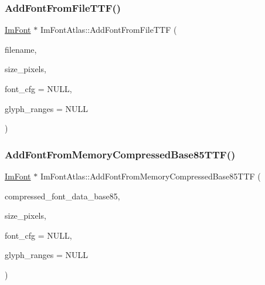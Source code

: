 \hypertarget{struct_im_font_atlas_a26d0333bae95222ca2c2fd2886eae562}{}\label{struct_im_font_atlas_a26d0333bae95222ca2c2fd2886eae562} 
\subsubsection{\texorpdfstring{Add\+Font\+From\+File\+T\+T\+F()}{AddFontFromFileTTF()}}
{\footnotesize\ttfamily \hyperlink{struct_im_font}{Im\+Font} $\ast$ Im\+Font\+Atlas\+::\+Add\+Font\+From\+File\+T\+TF (\begin{DoxyParamCaption}\item[{const char $\ast$}]{filename,  }\item[{float}]{size\+\_\+pixels,  }\item[{const \hyperlink{struct_im_font_config}{Im\+Font\+Config} $\ast$}]{font\+\_\+cfg = {\ttfamily NULL},  }\item[{const Im\+Wchar $\ast$}]{glyph\+\_\+ranges = {\ttfamily NULL} }\end{DoxyParamCaption})}

\hypertarget{struct_im_font_atlas_ab43b930beb57c0b998f42f4586677956}{}\label{struct_im_font_atlas_ab43b930beb57c0b998f42f4586677956} 
\subsubsection{\texorpdfstring{Add\+Font\+From\+Memory\+Compressed\+Base85\+T\+T\+F()}{AddFontFromMemoryCompressedBase85TTF()}}
{\footnotesize\ttfamily \hyperlink{struct_im_font}{Im\+Font} $\ast$ Im\+Font\+Atlas\+::\+Add\+Font\+From\+Memory\+Compressed\+Base85\+T\+TF (\begin{DoxyParamCaption}\item[{const char $\ast$}]{compressed\+\_\+font\+\_\+data\+\_\+base85,  }\item[{float}]{size\+\_\+pixels,  }\item[{const \hyperlink{struct_im_font_config}{Im\+Font\+Config} $\ast$}]{font\+\_\+cfg = {\ttfamily NULL},  }\item[{const Im\+Wchar $\ast$}]{glyph\+\_\+ranges = {\ttfamily NULL} }\end{DoxyParamCaption})}

